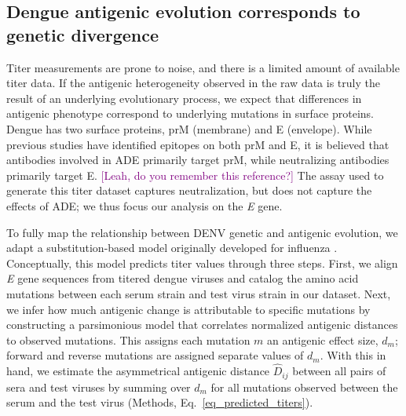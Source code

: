 \documentclass[11pt,oneside,letterpaper]{article}
\def\sbc#1{\textcolor{purple}{[#1]}}
\begin{document}
\subsection*{Dengue antigenic evolution corresponds to genetic divergence}
Titer measurements are prone to noise, and there is a limited amount of available titer data.
If the antigenic heterogeneity observed in the raw data is truly the result of an underlying evolutionary process, we expect that differences in antigenic phenotype correspond to underlying mutations in surface proteins.
Dengue has two surface proteins, prM (membrane) and E (envelope).
While previous studies have identified epitopes on both prM and E, it is believed that antibodies involved in ADE primarily target prM, while neutralizing antibodies primarily target E. \sbc{Leah, do you remember this reference?}
The assay used to generate this titer dataset captures neutralization, but does not capture the effects of ADE; we thus focus our analysis on the \textit{E} gene.

To fully map the relationship between DENV genetic and antigenic evolution, we adapt a substitution-based model originally developed for influenza \citep{neher2016prediction}.
Conceptually, this model predicts titer values through three steps.
First, we align \textit{E} gene sequences from titered dengue viruses and catalog the amino acid mutations between each serum strain and test virus strain in our dataset.
Next, we infer how much antigenic change is attributable to specific mutations by constructing a parsimonious model that correlates normalized antigenic distances to observed mutations.
This assigns each mutation $m$ an antigenic effect size, $d_m$; forward and reverse mutations are assigned separate values of $d_m$.
With this in hand, we estimate the asymmetrical antigenic distance $\hat{D}_{ij}$ between all pairs of sera and test viruses by summing over $d_m$ for all mutations observed between the serum and the test virus (Methods, Eq.~\ref{eq_predicted_titers}).
\end{document}
